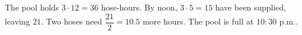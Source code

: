 The pool holds $3\cdot12=36$ hose-hours. By noon, $3\cdot5=15$ have been supplied, leaving $21$. Two hoses need $\dfrac{21}{2}=10.5$ more hours. The pool is full at $\boxed{10{:}30\text{ p.m.}}$.
